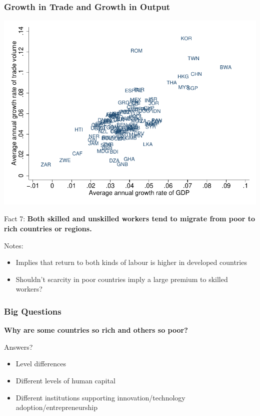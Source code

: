 \documentclass[shownotes,11pt, aspectratio=169]{beamer}
\begin{document}
\begin{frame}
\frametitle{Growth in Trade and Growth in Output}
\begin{center}
\includegraphics[scale=0.8]{graphs/figure_1_5.pdf}
\end{center}
\end{frame}


\begin{frame}
Fact 7: \textbf{Both skilled and unskilled workers tend to migrate from poor to rich countries or regions.}

\vspace{.25in}\noindent Notes:
\begin{itemize}
	\item Implies that return to both kinds of labour is higher in developed countries
	\item Shouldn't scarcity in poor countries imply a large premium to skilled workers?
\end{itemize}
\end{frame}


\begin{frame}
\frametitle{Big Questions}
\textbf{Why are some countries so rich and others so poor?}

\vspace{.25in}\noindent Answers?
\begin{itemize}
	\item Level differences
	\item Different levels of human capital
	\item Different institutions supporting innovation/technology adoption/entrepreneurship
\end{itemize}
\end{frame}
\end{document}
